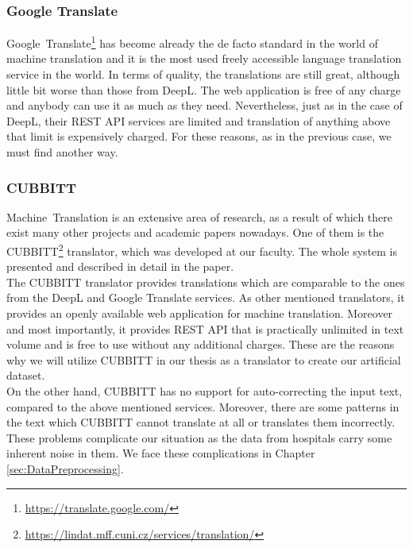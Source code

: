 \subsubsection{Google Translate}
Google~Translate\footnote[12]{\url{https://translate.google.com/}} has become already the de facto standard in the world of machine translation and it is the most used freely accessible language translation service in the world. In terms of quality, the translations are still great, although little bit worse than those from DeepL. The web application is free of any charge and anybody can use it as much as they need. Nevertheless, just as in the case of DeepL, their REST API services are limited and translation of anything above that limit is expensively charged. For these reasons, as in the previous case, we must find another way.

\subsubsection{CUBBITT}
\label{sec:Cubbitt}
Machine~Translation\citep{akhbardeh2021findings} is an extensive area of research, as a result of which there exist many other projects and academic papers nowadays. One of them is the CUBBITT\footnote[13]{\url{https://lindat.mff.cuni.cz/services/translation/}} translator, which was developed at our faculty. The whole system is presented and described in detail in the \citet{biblio:PoToTransformingmachine2020} paper.\\

The CUBBITT translator provides translations which are comparable to the ones from the DeepL and Google Translate services. As other mentioned translators, it provides an openly available web application for machine translation. Moreover and most importantly, it provides REST API that is practically unlimited in text volume and is free to use without any additional charges. These are the reasons why we will utilize CUBBITT in our thesis as a translator to create our artificial dataset.\\

On the other hand, CUBBITT has no support for auto-correcting the input text, compared to the above mentioned services. Moreover, there are some patterns in the text which CUBBITT cannot translate at all or translates them incorrectly. These problems complicate our situation as the data from hospitals carry some inherent noise in them. We face these complications in Chapter \ref{sec:DataPreprocessing}.


